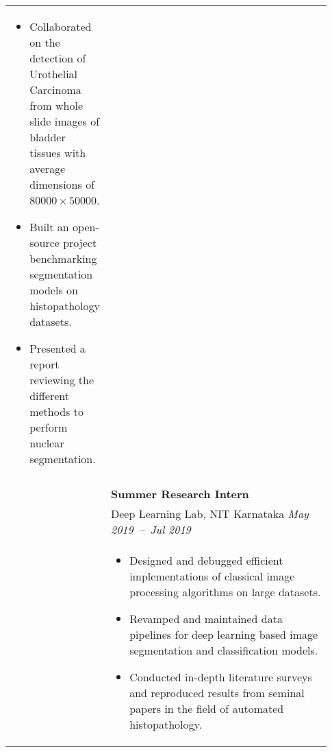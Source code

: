 \documentclass[letterpaper, 10pt, oneside]{article}
\newcommand{\bdit}[1]{{\textbf{#1}}}
\begin{document}
\begin{longtable}{@{} p{0.13\linewidth} p{0.8\linewidth}}
{\begin{itemize}[leftmargin=*, itemsep=-0.88ex, topsep=-0.88ex]
            \item Collaborated on the detection of Urothelial Carcinoma from whole slide images of bladder tissues with average dimensions of $80000\times50000$.
            \item Built an open-source project benchmarking segmentation models on histopathology datasets.
            \item Presented a report reviewing the different methods to perform nuclear segmentation.
        \end{itemize}
    }
    \\
    \\
                         & \bdit{Summer Research Intern}                                                                                                                                             \\
                         & Deep Learning Lab, NIT Karnataka \hfill \hspace{-3em} \textsl{May 2019\ --\ Jul 2019}                                                                                     \\
                         & \parbox{0.8\textwidth}{                                                                                                                                                   %
        \begin{itemize}[leftmargin=*, itemsep=-0.88ex, topsep=-0.88ex]
            \item Designed and debugged efficient implementations of classical image processing algorithms on large datasets.
            \item Revamped and maintained data pipelines for deep learning based image segmentation and classification models.
            \item Conducted in-depth literature surveys and reproduced results from seminal papers in the field of automated histopathology.
        \end{itemize}
    }
    \\
    \\


\end{longtable}
\end{document}
